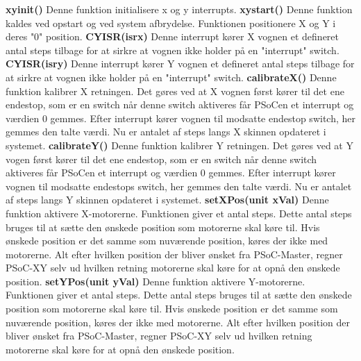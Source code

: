 \textbf{xy\textunderscore{}init()}\newline
Denne funktion initialisere x og y interrupts. \newline
\textbf{xy\textunderscore{}start()}\newline
Denne funktion kaldes ved opstart og ved system afbrydelse. Funktionen positionere X og Y i deres "0" position. \newline
\textbf{CY\textunderscore{}ISR(isr\textunderscore{}x)}\newline
Denne interrupt kører X vognen et defineret antal steps tilbage for at sirkre at vognen ikke holder på en "interrupt" switch.\newline
\textbf{CY\textunderscore{}ISR(isr\textunderscore{}y)}\newline
Denne interrupt kører Y vognen et defineret antal steps tilbage for at sirkre at vognen ikke holder på en "interrupt" switch.\newline
\textbf{calibrateX()}\newline
Denne funktion kalibrer X retningen. Det gøres ved at X vognen først kører til det ene endestop, som er en switch når denne switch aktiveres får PSoCen et interrupt og værdien 0 gemmes. Efter interrupt kører vognen til modsatte endestop switch, her gemmes den talte værdi. Nu er antalet af steps langs X skinnen opdateret i systemet.\newline
\textbf{calibrateY()}\newline
Denne funktion kalibrer Y retningen. Det gøres ved at Y vogen først kører til det ene endestop, som er en switch når denne switch aktiveres får PSoCen et interrupt og værdien 0 gemmes. Efter interrupt kører vognen til modsatte endestops switch, her gemmes den talte værdi. Nu er antalet af steps langs Y skinnen opdateret i systemet.\newline
\textbf{setXPos(unit xVal)}\newline
Denne funktion aktivere X-motorerne. Funktionen giver et antal steps. Dette antal steps bruges til at sætte den ønskede position som motorerne skal køre til. Hvis ønskede position er det samme som nuværende position, køres der ikke med motorerne. Alt efter hvilken position der bliver ønsket fra PSoC-Master, regner PSoC-XY selv ud hvilken retning motorerne skal køre for at opnå den ønskede position.\newline
\textbf{setYPos(unit yVal)}\newline
Denne funktion aktivere Y-motorerne. Funktionen giver et antal steps. Dette antal steps bruges til at sætte den ønskede position som motorerne skal køre til. Hvis ønskede position er det samme som nuværende position, køres der ikke med motorerne. Alt efter hvilken position der bliver ønsket fra PSoC-Master, regner PSoC-XY selv ud hvilken retning motorerne skal køre for at opnå den ønskede position.\newline
